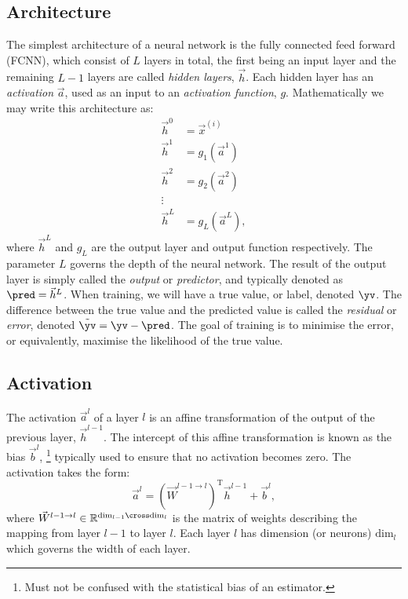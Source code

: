     \subsection{Architecture}
        The simplest architecture of a neural network is the fully connected feed forward (FCNN), which consist of $L$ layers in total, the first being an input layer and the remaining $L-1$ layers are called \textit{hidden layers}, $\vec{h}$. Each hidden layer has an \textit{activation} $\vec{a}$, used as an input to an \textit{activation function}, $g$. Mathematically we may write this architecture as:
        \begin{equation}\label{eq:ML:NN:architecture}
            \begin{split}
                \vec{h}^0 &= \vec{x}^{(i)} \\
                \vec{h}^1 &= g_1(\vec{a}^1) \\
                \vec{h}^2 &= g_2(\vec{a}^2) \\
                \vdots & \\
                \vec{h}^{L} &= g_L(\vec{a}^L),
            \end{split}
        \end{equation}
        where $\vec{h}^L$ and $g_L$ are the output layer and output function respectively. The parameter $L$ governs the depth of the neural network. The result of the output layer is simply called the \textit{output} or \textit{predictor}, and typically denoted as $\pred = \vec{h}^L$. When training, we will have a true value, or label, denoted $\yv$. The difference between the true value and the predicted value is called the \textit{residual} or \textit{error}, denoted $\tilde{\yv} = \yv - \pred$. The goal of training is to minimise the error, or equivalently, maximise the likelihood of the true value.



    \subsection{Activation}
        The activation $\vec{a}^l$ of a layer $l$ is an affine transformation of the output of the previous layer, $\vec{h}^{l-1}$. The intercept of this affine transformation is known as the bias $\vec{b}^l$, \footnote{Must not be confused with the statistical bias of an estimator.} typically used to ensure that no activation becomes zero. The activation takes the form:
        \begin{equation}\label{eq:ML:NN:activation}
            \vec{a}^l = (\vec{W}^{l-1\to l})^\mathrm{T}\vec{h}^{l-1} + \vec{b}^l,
        \end{equation}
        where $\vec{W}^{l-1\to l} \in \mathbb{R}^{\mathrm{dim}_{l-1}\cross\mathrm{dim}_l}$ is the matrix of weights describing the mapping from layer $l-1$ to layer $l$. Each layer $l$ has dimension (or neurons) $\mathrm{dim}_l$ which governs the width of each layer. 

